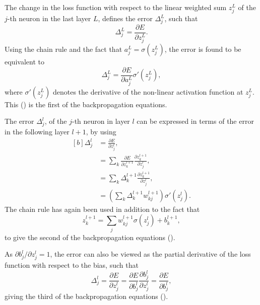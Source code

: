 The change in the loss function with respect to the linear weighted sum $z^{L}_{j}$ of the $j$-th
neuron in the last layer $L$, defines the error $\Delta^{L}_{j}$, such that
\begin{equation} %
    \Delta^{L}_{j}=\frac{\partial E}{\partial z^{L}_{j}}.
\end{equation}
Using the chain rule and the fact that $a^{L}_{j}=\sigma(z^{L}_{j})$, the error is found to be
equivalent to
\begin{equation} %
    \Delta^{L}_{j}=\frac{\partial E}{\partial a^{L}_{j}}
    \sigma '(z^{L}_{j}),
    \label{eq:backprop_1}
\end{equation}
where $\sigma '(z^{L}_{j})$ denotes the derivative of the non-linear activation function at
$z^{L}_{j}$. This () is the first of the backpropagation equations.

The error $\Delta^{l}_{j}$, of the $j$-th neuron in layer $l$ can be expressed in terms of the
error in the following layer $l+1$, by using
\begin{equation} %
    \begin{aligned}[b]
        \Delta^{l}_{j} &=\frac{\partial E}{\partial z^{l}_{j}}, \\
        &=\sum_{k}\frac{\partial E}{\partial z^{l+1}_{k}}
        \frac{\partial z^{l+1}_{k}}{\partial z^{l}_{j}}, \\
        &=\sum_{k}\Delta^{l+1}_{k}\frac{\partial z^{l+1}_{k}}{\partial z^{l}_{j}}, \\
        &=\left(\sum_{k}\Delta^{l+1}_{k}w^{l+1}_{kj}\right)\sigma '(z^{l}_{j}).
        \label{eq:backprop_2}
    \end{aligned}
\end{equation}
The chain rule has again been used in addition to the fact that
\begin{equation}
    z^{l+1}_{k}=\sum_{j}w^{l+1}_{kj}\sigma(z^{l}_{j})+b^{l+1}_k,
\end{equation}
to give the second of the backpropagation equations ().

As $\partial b^{l}_{j}/\partial z^{l}_{j}=1$, the error can also be viewed as the partial
derivative of the loss function with respect to the bias, such that
\begin{equation} %
    \Delta^{l}_{j}=\frac{\partial E}{\partial z^{l}_{j}}
    =\frac{\partial E}{\partial b^{l}_{j}}\frac{\partial b^{l}_{j}}{\partial z^{l}_{j}}
    =\frac{\partial E}{\partial b^{l}_{j}},
    \label{eq:backprop_3}
\end{equation}
giving the third of the backpropagation equations ().

